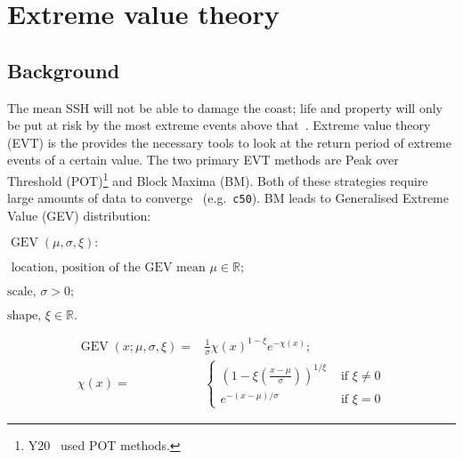 \newpage
\newpage
[.]
\pagebreak

\section{Extreme value theory}
\label{sec:evt}
\subsection{Background}
The mean SSH will
not be able to damage the coast; life and property will only be put
at risk by the most extreme events above that~\cite{taleb2019statistical, Taleb2012AntifragileH}.
Extreme value theory (EVT) is the provides the necessary tools
to look at the return period of extreme events of a certain value.
The two primary EVT methods are Peak over Threshold (POT)\footnote{Y20~\cite{ZannaPreprint} used POT methods. } and Block Maxima (BM).
Both of these strategies require
large amounts of data to converge~\cite{taleb2019much} (e.g.~\texttt{c50}).
BM leads to Generalised Extreme Value (GEV) distribution:


    \(
    \operatorname{GEV}(\mu, \sigma, \xi):
    \)

    \(
    \text{ location, position of the GEV mean } \mu \in \mathbb{R};
    \)

    \(
    \text{scale, } \sigma>0;
    \)

    \(
    \text{shape, } \xi \in \mathbb{R}.
    \)

    \iffalse
    \begin{align}
        \chi(x)=&\{
               \begin{array}{ll}
                    \left(1- \xi\left(\frac{x-
                    \mu}{\sigma} \right)\right)^{\frac{1}{\xi}} &
                     \text { if } \xi \neq 0 \\
                    e^{-\frac{x-\mu}{\sigma}} &
                    \text { if } \xi=0 \\

              \end{array}.
    \tag{GEV-2} \label{eq:GEV-2}

    \end{align}
    \fi

\begin{align}
    \operatorname{GEV}(x; \mu, \sigma, \xi)=&
    \frac{1}{\sigma} \chi(x)^{1-\xi} e^{-\chi(x)}; \tag{GEV-1}
    \label{eq:GEV-1}\\
    \chi(x)=&\left\{\begin{array}{ll}
    \left(1-\xi\left(\frac{x-\mu}{\sigma}\right)\right)^{1 / \xi} & \text { if } \xi \neq 0 \\
    e^{-(x-\mu) / \sigma} & \text { if } \xi=0 \tag{GEV-2}
    \end{array}\right.
   \label{eq:GEV-2}
\end{align}


